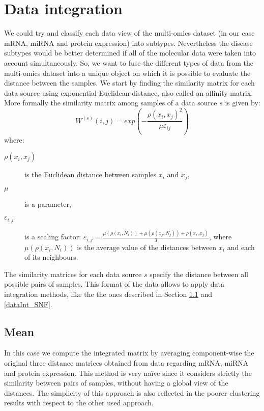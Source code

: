 \section{Data integration}\label{methods_dataInt}
We could try and classify each data view of the multi-omics dataset (in our case mRNA, miRNA and protein expression) into subtypes. Nevertheless the disease subtypes would be better determined if all of the molecular data were taken into account simultaneously. So, we want to fuse the different types of data from the multi-omics dataset into a unique object on which it is possible to evaluate the distance between the samples. We start by finding the similarity matrix for each data source using exponential Euclidean distance, also called an affinity matrix.
More formally the similarity matrix among samples of a data source $s$ is given by:
\begin{equation*}
    W^{(s)}(i,j) = exp \left(- \frac{\rho(x_i,x_j)^2}{\mu \varepsilon_{ij}}\right)
\end{equation*}
where:
\begin{description}
    \item [$\rho(x_i, x_j)$] is the Euclidean  distance  between samples \(x_i\) and \(x_j\),
    \item [$\mu$] is a parameter,
    \item [$\varepsilon_{i,j}$] is a scaling factor: $\varepsilon_{i,j} = \frac{\mu(\rho(x_i, N_i)) + \mu(\rho(x_j, N_j)) + \rho(x_i, x_j)}{3}$, where  $\mu(\rho(x_i, N_i))$ is the average value of the distances between $x_i$ and each of its neighbours.
\end{description}
The similarity matrices for each data source $s$ specify the distance between all possible pairs of samples. This format of the data allows to apply data integration methods, like the the ones described in Section \ref{dataInt_mean} and \ref{dataInt_SNF}.

\subsection{Mean} \label{dataInt_mean}
In this case we compute the integrated matrix by averaging component-wise the original three distance matrices obtained from data regarding mRNA, miRNA and protein expression. This method is very naïve since it considers strictly the similarity between pairs of samples, without having a global view of the distances. The simplicity of this approach is also reflected in the poorer clustering results with respect to the other used approach.

